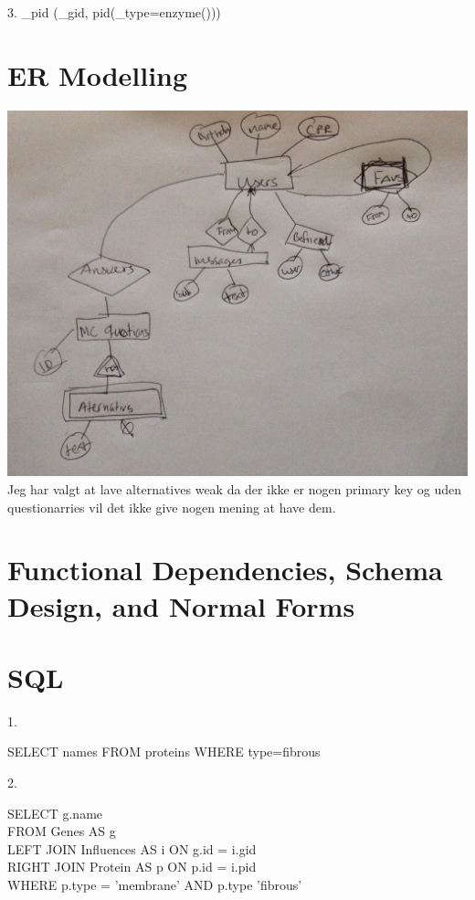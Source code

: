 \documentclass[12pt]{article}
\begin{document}
{3. \pi_{pid} (\pi_{gid, pid}(\sigma_{type=enzyme}()))

\section{ER Modelling}

\includegraphics[scale=0.2]{photo.jpg}\\

Jeg har valgt at lave alternatives weak da der ikke er nogen primary key og uden questionarries vil det ikke give nogen mening at have dem.

\section {Functional Dependencies, Schema Design, and Normal Forms}

\section {SQL}

1.

SELECT names FROM proteins WHERE type=fibrous

2.

SELECT g.name\\
FROM Genes AS g\\
LEFT JOIN Influences AS i ON g.id = i.gid\\
RIGHT JOIN Protein AS p ON p.id = i.pid\\
WHERE p.type = 'membrane' AND p.type 'fibrous'\\

}
\end{document}
